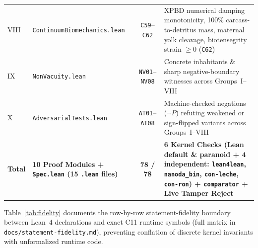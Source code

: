 \documentclass[11pt,reqno]{amsart}
\theoremstyle{plain}
\theoremstyle{definition}
\theoremstyle{remark}
\newcommand{\code}[1]{{\footnotesize\nolinkurl{#1}}}
\newcommand{\tcode}[1]{{\scriptsize\nolinkurl{#1}}}
\begin{document}
\begin{table}[ht]
\begin{tabularx}{\textwidth}{@{} l l c Y @{}}
VIII & \tcode{ContinuumBiomechanics.lean} & \tcode{C59}--\tcode{C62} & XPBD numerical damping monotonicity, 100\% carcass-to-detritus mass, maternal yolk cleavage, biotensegrity strain $\ge 0$ (\tcode{C62}) \\
IX   & \tcode{NonVacuity.lean} & \tcode{NV01}--\tcode{NV08} & Concrete inhabitants \& sharp negative-boundary witnesses across Groups~I--VIII \\
X    & \tcode{AdversarialTests.lean} & \tcode{AT01}--\tcode{AT08} & Machine-checked negations ($\neg P$) refuting weakened or sign-flipped variants across Groups~I--VIII \\
\midrule
\textbf{Total} & \textbf{10 Proof Modules + \tcode{Spec.lean} (15 \tcode{.lean} files)} & \textbf{78 / 78} & \textbf{6 Kernel Checks (Lean default \& paranoid + 4 independent: \tcode{lean4lean}, \tcode{nanoda\_bin}, \tcode{con-leche}, \tcode{con-ron}) + \tcode{comparator} + Live Tamper Reject} \\
\bottomrule
\end{tabularx}
\end{table}

Table~\ref{tab:fidelity} documents the row-by-row statement-fidelity boundary between Lean~4 declarations and exact C11 runtime symbols (full matrix in \code{docs/statement-fidelity.md}), preventing conflation of discrete kernel invariants with unformalized runtime code.
\end{document}
